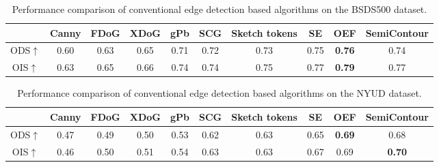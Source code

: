 \documentclass[a4paper, 10pt]{article}
\begin{document}
			\begin{table}[!htbp]
				\centering
				\tiny
					\begin{tabular}{c|c|c|c|c|c|c|c|c|c}
						
						\hline
						
						\textbf{} & \textbf{Canny} & \textbf{FDoG} & \textbf{XDoG} & \textbf{gPb} & \textbf{SCG} &  \textbf{Sketch tokens} & \textbf{SE} & \textbf{OEF} & \textbf{SemiContour} \\
						
						\hline
						
						ODS$\uparrow$ & 0.60 & 0.63 & 0.65 & 0.71 & 0.72 & 0.73 & 0.75 & \textbf{0.76} & 0.74 \\
						
						OIS$\uparrow$ & 0.63 & 0.65 & 0.66 & 0.74 & 0.74 & 0.75 & 0.77 & \textbf{0.79} & 0.77 \\
						
						\hline
						
					\end{tabular}
				\captionsetup{font=scriptsize} 
				\caption{\label{tab: Algorithms on the BSDS500 dataset}
					Performance comparison of conventional edge detection based algorithms on the BSDS500 dataset.} 
			\end{table}
			
			\begin{table}[!htbp]
				\centering
				\tiny
					\begin{tabular}{c|c|c|c|c|c|c|c|c|c}
						
						\hline
						
						\textbf{} & \textbf{Canny} & \textbf{FDoG} & \textbf{XDoG} & \textbf{gPb} & \textbf{SCG} &  \textbf{Sketch tokens} & \textbf{SE} & \textbf{OEF} & \textbf{SemiContour} \\
						
						\hline
						
						ODS$\uparrow$ & 0.47 & 0.49 & 0.50 & 0.53 & 0.62 & 0.63 & 0.65 & \textbf{0.69} & 0.68 \\
						
						OIS$\uparrow$ & 0.46 & 0.50 & 0.51 & 0.54 & 0.63 & 0.63 & 0.67 & 0.69 & \textbf{0.70} \\
						
						\hline
						
					\end{tabular}
				\captionsetup{font=scriptsize} 
				\caption{\label{tab: Algorithms on the NYUD dataset}
					Performance comparison of conventional edge detection based algorithms on the NYUD dataset.} 
			\end{table}
			
\end{document}
